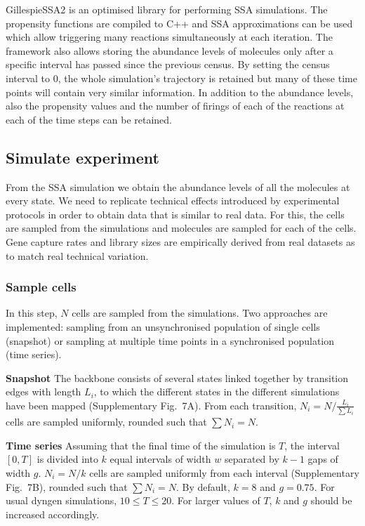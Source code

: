 \documentclass[
  table,
  10pt,
  a4paper]{article}
\begin{document}
GillespieSSA2 is an optimised library for performing SSA simulations.
The propensity functions are compiled to C++ and SSA approximations can
be used which allow triggering many reactions simultaneously at each
iteration. The framework also allows storing the abundance levels of
molecules only after a specific interval has passed since the previous
census. By setting the census interval to 0, the whole simulation's
trajectory is retained but many of these time points will contain very
similar information. In addition to the abundance levels, also the
propensity values and the number of firings of each of the reactions at
each of the time steps can be retained.

\hypertarget{sec:dyngen-experiment}{%
\subsection{Simulate experiment}\label{sec:dyngen-experiment}}

From the SSA simulation we obtain the abundance levels of all the
molecules at every state. We need to replicate technical effects
introduced by experimental protocols in order to obtain data that is
similar to real data. For this, the cells are sampled from the
simulations and molecules are sampled for each of the cells. Gene
capture rates and library sizes are empirically derived from real
datasets as to match real technical variation.

\hypertarget{sample-cells}{%
\subsubsection{Sample cells}\label{sample-cells}}

In this step, \(N\) cells are sampled from the simulations. Two
approaches are implemented: sampling from an unsynchronised population
of single cells (snapshot) or sampling at multiple time points in a
synchronised population (time series).

\textbf{Snapshot} The backbone consists of several states linked
together by transition edges with length \(L_i\), to which the different
states in the different simulations have been mapped (Supplementary
Fig.~7A). From each transition, \(N_i = N / \frac{L_i}{\sum L_i}\) cells
are sampled uniformly, rounded such that \(\sum N_i = N\).

\textbf{Time series} Assuming that the final time of the simulation is
\(T\), the interval \([0, T]\) is divided into \(k\) equal intervals of
width \(w\) separated by \(k-1\) gaps of width \(g\). \(N_i = N / k\)
cells are sampled uniformly from each interval (Supplementary Fig.~7B),
rounded such that \(\sum N_i = N\). By default, \(k = 8\) and
\(g = 0.75\). For usual dyngen simulations, \(10 \leq T \leq 20\). For
larger values of \(T\), \(k\) and \(g\) should be increased accordingly.
\end{document}
